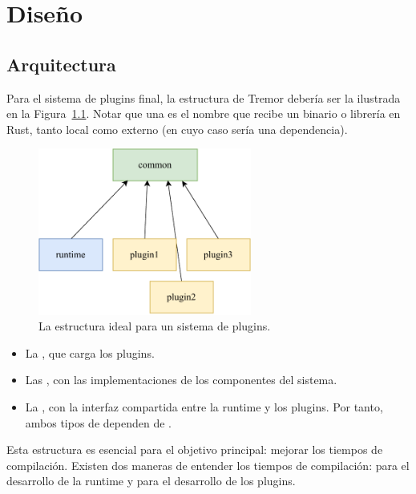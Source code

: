 
\chapter{Diseño}\label{sec:design}

\section{Arquitectura}

Para el sistema de plugins final, la estructura de Tremor debería ser la
ilustrada en la Figura~\ref{fig:separation}. Notar que una \crate es el nombre
que recibe un binario o librería en Rust, tanto local como externo (en cuyo caso
sería una dependencia).

\begin{figure}
    \centering
    \includegraphics[width=7cm]{./Imagenes/separation.pdf}
    \caption{La estructura ideal para un sistema de plugins.}%
    \label{fig:separation}
\end{figure}

\begin{itemize}
    \item La \crate {}, que carga los plugins.

    \item Las \crates {}, con las implementaciones de los componentes
        del sistema.

    \item La \crate {}, con la interfaz compartida entre la runtime y
        los plugins. Por tanto, ambos tipos de \crate dependen de .

\end{itemize}

Esta estructura es esencial para el objetivo principal: mejorar los tiempos de
compilación. Existen dos maneras de entender los tiempos de compilación: para el
desarrollo de la runtime y para el desarrollo de los plugins.


